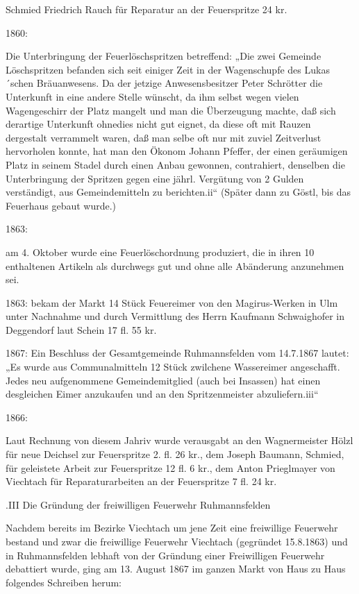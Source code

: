 Schmied Friedrich Rauch für Reparatur an der Feuerspritze 24 kr.

1860:

Die Unterbringung der Feuerlöschspritzen betreffend: „Die zwei Gemeinde
Löschspritzen befanden sich seit einiger Zeit in der Wagenschupfe des
Lukas´schen Bräuanwesens. Da der jetzige Anwesensbesitzer Peter Schrötter die
Unterkunft in eine andere Stelle wünscht, da ihm selbst wegen vielen
Wagengeschirr der Platz mangelt und man die Überzeugung machte, daß sich
derartige Unterkunft ohnedies nicht gut eignet, da diese oft mit Rauzen
dergestalt verrammelt waren, daß man selbe oft nur mit zuviel Zeitverlust
hervorholen konnte, hat man den Ökonom Johann Pfeffer, der einen geräumigen
Platz in seinem Stadel durch einen Anbau gewonnen, contrahiert, denselben die
Unterbringung der Spritzen gegen eine jährl. Vergütung von 2 Gulden verständigt,
aus Gemeindemitteln zu berichten.ii“ (Später dann zu Göstl, bis das Feuerhaus
gebaut wurde.)

1863:

am 4. Oktober wurde eine Feuerlöschordnung produziert, die in ihren 10
enthaltenen Artikeln als durchwegs gut und ohne alle Abänderung anzunehmen sei.

1863:   bekam der Markt 14 Stück Feuereimer von den Magirus-Werken in Ulm unter
Nachnahme und durch Vermittlung des Herrn Kaufmann Schwaighofer in Deggendorf
laut Schein 17 fl. 55 kr.

1867:   Ein Beschluss der Gesamtgemeinde Ruhmannsfelden vom 14.7.1867 lautet:
„Es wurde aus Communalmitteln 12 Stück zwilchene Wassereimer angeschafft. Jedes
neu aufgenommene Gemeindemitglied (auch bei Insassen) hat einen desgleichen
Eimer anzukaufen und an den Spritzenmeister abzuliefern.iii“

1866:

Laut Rechnung von diesem Jahriv wurde verausgabt an den Wagnermeister Hölzl für
neue Deichsel zur Feuerspritze 2. fl. 26 kr., dem Joseph Baumann, Schmied, für
geleistete Arbeit zur Feuerspritze 12 fl. 6 kr., dem Anton Prieglmayer von
Viechtach für Reparaturarbeiten an der Feuerspritze 7 fl. 24 kr.

.III Die Gründung der freiwilligen Feuerwehr Ruhmannsfelden

Nachdem bereits im Bezirke Viechtach um jene Zeit eine freiwillige Feuerwehr
bestand und zwar die freiwillige Feuerwehr Viechtach (gegründet 15.8.1863) und
in Ruhmannsfelden lebhaft von der Gründung einer Freiwilligen Feuerwehr
debattiert wurde, ging am 13. August 1867 im ganzen Markt von Haus zu Haus
folgendes Schreiben herum:



